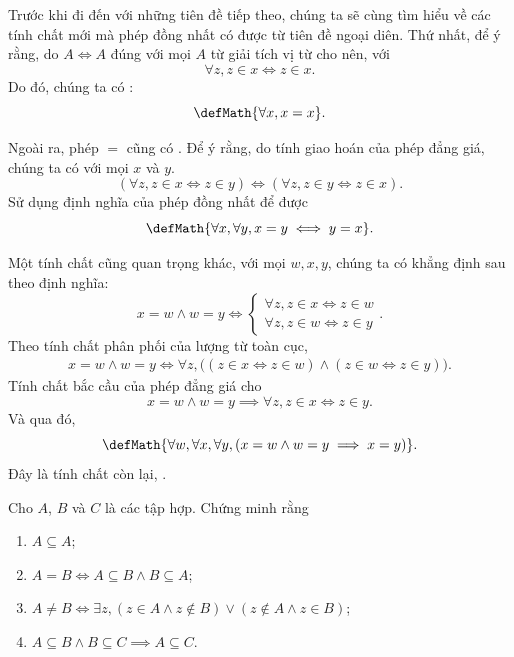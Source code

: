 Trước khi đi đến với những tiên đề tiếp theo, chúng ta sẽ cùng tìm hiểu về các tính chất mới mà phép đồng nhất có được từ tiên đề ngoại diên. Thứ nhất, để ý rằng, do $A \iff A$ đúng với mọi $A$ từ giải tích vị từ cho nên, với
\begin{equation*}
    \forall z, z \in x \iff z \in x.
\end{equation*}
Do đó, chúng ta có :
\begin{equation*}
    \defMath{\forall x, x = x}.
\end{equation*}

Ngoài ra, phép $=$ cũng có . Để ý rằng, do tính giao hoán của phép đẳng giá, chúng ta có với mọi $x$ và $y$.
\begin{equation*}
    (\forall z, z \in x \iff z \in y) \iff (\forall z, z \in y \iff z \in x).
\end{equation*}
Sử dụng định nghĩa của phép đồng nhất để được
\begin{equation*}
    \defMath{\forall x, \forall y, x = y \iff y = x}.
\end{equation*}

Một tính chất cũng quan trọng khác, với mọi $w, x, y$, chúng ta có khẳng định sau theo định nghĩa:
\begin{equation*}
    x = w \land w = y \iff \begin{cases}
        \forall z, z \in x \iff z \in w \\
        \forall z, z \in w \iff z \in y
    \end{cases}.
\end{equation*}
Theo tính chất phân phối của lượng từ toàn cục,
\begin{align*}
    x = w \land w = y \iff\forall z, \big((z \in x \iff z \in w) \land (z \in w \iff z \in y)\big).
\end{align*}
Tính chất bắc cầu của phép đẳng giá cho
\begin{equation*}
    x = w \land w = y \implies \forall z, z \in x \iff z \in y.
\end{equation*}
Và qua đó,
\begin{equation*}
    \defMath{\forall w, \forall x, \forall y, \left( x = w \land w = y \implies x = y \right)}.
\end{equation*}
Đây là tính chất còn lại, .

\exercise Cho $A$, $B$ và $C$ là các tập hợp. Chứng minh rằng
\begin{enumerate}
   \item $A \subseteq A$;
   \item $A = B \iff A \subseteq B \land B \subseteq A$;
   \item $A \neq B \iff \exists z, (z \in A \land z \notin B) \lor (z \notin A \land z \in B)$;
   \item $A \subseteq B \land B \subseteq C \implies A \subseteq C$.
\end{enumerate}

